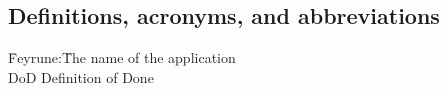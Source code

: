 \subsection{Definitions, acronyms, and abbreviations}
\begin{comment}
Create a word list to avoid confusion and give a definition of every abbreviation
you use in the document.
\end{comment}
\label{wordlist}
\begin{tabbing}
	\indent\= Feyrune:\indent\indent\= The name of the application\\
	\> DoD\> Definition of Done
\end{tabbing}